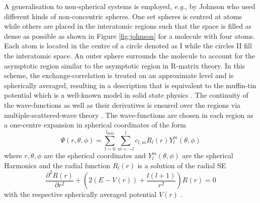 A generalisation to non-spherical systems is employed, \textit{e.g.}, by Johnson \cite{johnson} who used different kinds of non-concentric spheres.
One set spheres is centred at atoms while others are placed in the interatomic regions such that the space is filled as dense as possible as shown in Figure \ref{fig:johnson} for a molecule with four atoms.
Each atom is located in the centre of a circle denoted as I while the circles II fill the interatomic space.
An outer sphere surrounds the molecule to account for the asymptotic region similar to the asymptotic region in R-matrix theory.
In this scheme, the exchange-correlation is treated on an approximate level \cite{slaterJohn} and is spherically averaged, resulting in a description that is equivalent to the muffin-tin potential which is a well-known model in solid state physics \cite{MufTin,MufTin1}.
The continuity of the wave-functions as well as their derivatives is ensured over the regions via multiple-scattered-wave theory \cite{johnson}.
The wave-functions are chosen in each region as a one-centre expansion in spherical coordinates of the form
\begin{equation} \label{eq:radSE}
\Psi(r, \theta, \phi) =\sum_{l=0}^{l_\text{max}}\sum_{m=-l}^l c_{l,m} R_l(r) Y_l^m(\theta, \phi)
\end{equation}
where $r,\theta,\phi$ are the spherical coordinates and $Y_l^m(\theta,\phi)$ are the spherical Harmonics \cite{Lifschitz} and the radial function $R_l(r)$ is a solution of the radial SE 
\begin{equation} \label{eq:radSEeq}
\frac{\partial^2 R(r)}{\partial r^2} + \left( 2\left(E-V(r)\right) + \frac{l(l+1)}{r^2} \right)R(r)=0
\end{equation}
with the respective spherically averaged potential $V(r)$ \cite{johnson}.

